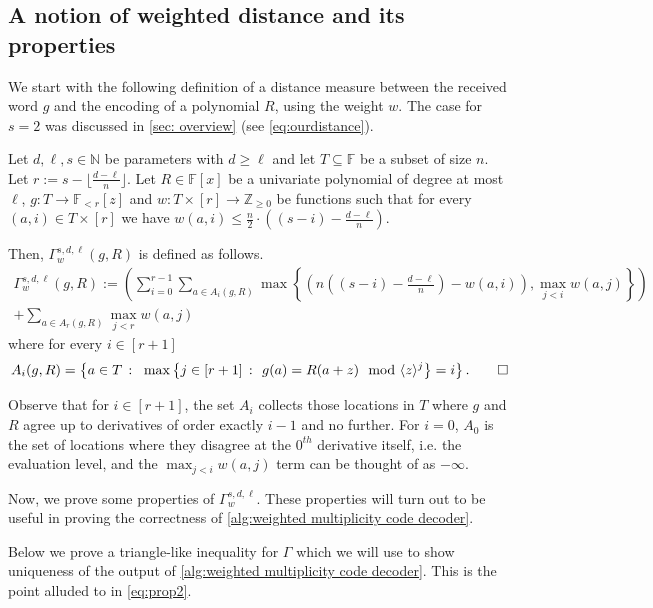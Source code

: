 \documentclass{article}
\def\Integer{\mathbb{Z}}
\def\Natural{\mathbb{N}}
\def\Field{\mathbb{F}}
\let\N\Natural
\let\Z\Integer
\let\F\Field
\def\inbrace#1{\left\{ #1 \right\}}
\def\setdef#1#2{\inbrace{ #1 \ \colon \ #2}}      %
\begin{document}
	\subsection{A notion of weighted distance and its properties}\label{sec:weighted distance}
	We start with the following definition of a distance measure between the received word $g$ and the encoding of a polynomial $R$, using the weight $w$. The case for $s=2$ was discussed in \cref{sec: overview} (see \cref{eq:ourdistance}).
	\begin{definition} \label{def: gamma}
		Let $d, \ell, s \in \N$ be parameters with $d \geq \ell$ and let $T
		\subseteq \F$ be a subset of size $n$. 
		Let  $r:=s-\lfloor \frac{d-\ell}{n} \rfloor$. Let $R \in \F[x]$ be a
		univariate polynomial of degree at most $\ell$, $g\colon T \to
		\F_{<r}[z]$ and $w\colon  T \times [r] \to \Z_{\geq 0}$ be functions
		such that for every $(a, i) \in T \times [r]$ we have $w(a,i) \leq
		\frac{n}{2}\cdot \left((s-i) - \frac{d-\ell}{n}\right)$. 
		
		Then, $\Gamma_w^{s, d, \ell}(g, R)$ is defined as follows. 
		\begin{multline*}
		\Gamma_w^{s, d, \ell}(g, R) :=  \left(\sum_{i = 0}^{r-1}\sum_{a \in A_i(g,R)} \max \left\{\left(n\left((s-i) - \frac{d-\ell}{n}\right) - w(a,i)\right), \max_{j < i} w(a, j) \right\}\right)\\
        + \sum_{a\in A_r(g,R)} \max_{j < r} w(a, j)
		\end{multline*}
		where for every $i \in [r+1]$
		\[
		A_i(g,R)=\setdef{a\in T}{\max{\setdef{j\in [r+1]}{g(a)=R(a+z) \mod \langle z\rangle^{j}}}=i}. \qedhere
		\] 
		
	\end{definition}
	Observe that for $i\in [r+1]$, the set $A_i$ collects those locations in $T$ where $g$ and $R$ agree up to derivatives of order exactly $i-1$ and no further. For $i=0$, $A_0$ is the set of locations where they disagree at the $0^{th}$ derivative itself, i.e. the evaluation level, and the $\max_{j < i} w(a, j)$ term can be thought of as $- \infty$.
	
	Now, we prove some properties of $\Gamma_w^{s, d, \ell}$. These properties will turn out to be useful in proving the correctness of \cref{alg:weighted multiplicity code decoder}.
	
	
	
	Below we prove a triangle-like inequality for $\Gamma$ which we will use to show uniqueness of the output of \cref{alg:weighted multiplicity code decoder}. This is the point alluded to in \cref{eq:prop2}.
	
\end{document}
